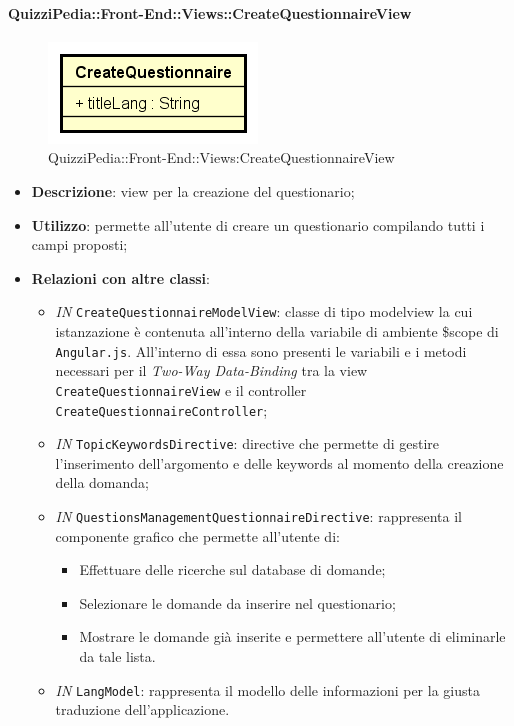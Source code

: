 \paragraph{QuizziPedia::Front-End::Views::CreateQuestionnaireView}
\begin{figure} [ht]
	\centering
	\includegraphics[scale=0.45]{UML/Classi/Front-End/QuizziPedia_Front-end_CreateQuestionnaireView.png}
	\caption{QuizziPedia::Front-End::Views:CreateQuestionnaireView}
\end{figure} \FloatBarrier
\begin{itemize}
	\item \textbf{Descrizione}: view per la creazione del questionario;
	\item \textbf{Utilizzo}: permette all'utente di creare un questionario compilando tutti i campi proposti;
	\item \textbf{Relazioni con altre classi}:
	\begin{itemize}
		\item \textit{IN} \texttt{CreateQuestionnaireModelView}: classe di tipo modelview la cui istanzazione è contenuta all'interno della variabile di ambiente \$scope di \texttt{Angular.js}. All'interno di essa sono presenti le variabili e i metodi necessari per il \textit{Two-Way Data-Binding} tra la view \texttt{CreateQuestionnaireView} e il controller \texttt{CreateQuestionnaireController};
		\item \textit{IN} \texttt{TopicKeywordsDirective}: directive che permette di gestire l'inserimento dell'argomento e delle keywords al momento della creazione della domanda;
		\item \textit{IN} \texttt{QuestionsManagementQuestionnaireDirective}: rappresenta il componente grafico che permette all'utente di:
		\begin{itemize}
			\item Effettuare delle ricerche sul database di domande;
			\item Selezionare le domande da inserire nel questionario;
			\item Mostrare le domande già inserite e permettere all'utente di eliminarle da tale lista.
		\end{itemize}
		\item \textit{IN} \texttt{LangModel}: rappresenta il modello delle informazioni per la giusta traduzione dell'applicazione.

\end{itemize}
\end{itemize}
